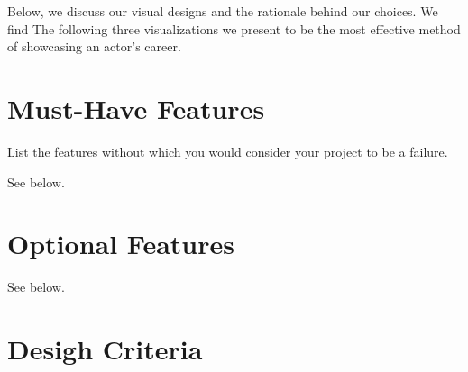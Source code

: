 \documentclass[12pt]{article}
\begin{document}
  Below, we discuss our visual designs and the rationale behind our choices.  We find The following three visualizations we present to be the most effective method of showcasing an actor's career.
\section{Must-Have Features}

List the features without which you would consider your project to be a failure.

See below.

\section{Optional Features}
See below.
 

\newpage

\section{Desigh Criteria}
\end{document}
